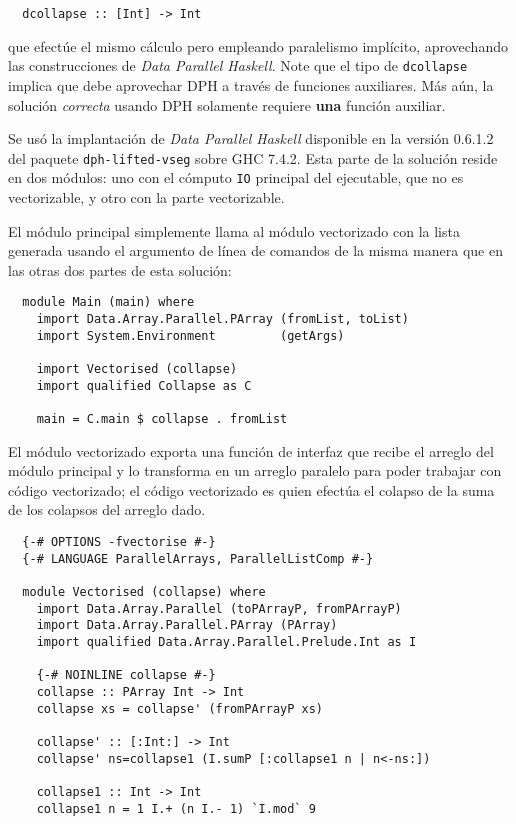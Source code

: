 \documentclass[11pt,fleqn]{article}
\newenvironment{answer}{%
  \def\FrameCommand{\fboxsep=\FrameSep \fcolorbox{black}{midgrey}}%
  \color{black}\MakeFramed {\FrameRestore}}%
 {\endMakeFramed}
\begin{document}
\begin{itemize}
\begin{lstlisting}
  dcollapse :: [Int] -> Int
\end{lstlisting}

  que efectúe el mismo cálculo pero empleando paralelismo implícito,
  aprovechando las construcciones de \emph{Data Parallel Haskell}.
  Note que el tipo de \texttt{dcollapse} implica que debe aprovechar
  DPH a través de funciones auxiliares. Más aún, la solución
  \emph{correcta} usando DPH solamente requiere \textbf{una}
  función auxiliar.

\begin{answer}
  Se usó la implantación de \textit{Data Parallel Haskell} disponible en
  la versión 0.6.1.2 del paquete \texttt{dph-lifted-vseg} sobre GHC
  7.4.2.  Esta parte de la solución reside en dos módulos: uno con el
  cómputo \texttt{IO} principal del ejecutable, que no es vectorizable,
  y otro con la parte vectorizable.

  El módulo principal simplemente llama al módulo vectorizado con la
  lista generada usando el argumento de línea de comandos de la misma
  manera que en las otras dos partes de esta solución:

\begin{lstlisting}
  module Main (main) where
    import Data.Array.Parallel.PArray (fromList, toList)
    import System.Environment         (getArgs)

    import Vectorised (collapse)
    import qualified Collapse as C

    main = C.main $ collapse . fromList
\end{lstlisting}

  El módulo vectorizado exporta una función de interfaz que recibe el
  arreglo del módulo principal y lo transforma en un arreglo paralelo
  para poder trabajar con código vectorizado; el código vectorizado es
  quien efectúa el colapso de la suma de los colapsos del arreglo dado.

\begin{lstlisting}
  {-# OPTIONS -fvectorise #-}
  {-# LANGUAGE ParallelArrays, ParallelListComp #-}

  module Vectorised (collapse) where
    import Data.Array.Parallel (toPArrayP, fromPArrayP)
    import Data.Array.Parallel.PArray (PArray)
    import qualified Data.Array.Parallel.Prelude.Int as I

    {-# NOINLINE collapse #-}
    collapse :: PArray Int -> Int
    collapse xs = collapse' (fromPArrayP xs)

    collapse' :: [:Int:] -> Int
    collapse' ns=collapse1 (I.sumP [:collapse1 n | n<-ns:])

    collapse1 :: Int -> Int
    collapse1 n = 1 I.+ (n I.- 1) `I.mod` 9
\end{lstlisting}
\end{answer}
\end{itemize}
\end{document}
